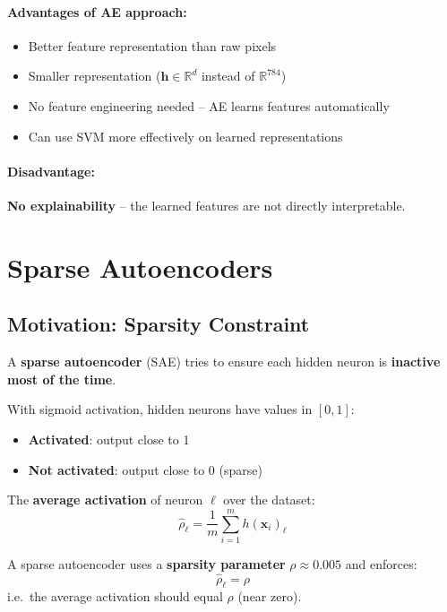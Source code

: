 \documentclass[12pt,a4paper]{article}
\newcommand{\R}{\mathbb{R}}
\newcommand{\vx}{\mathbf{x}}
\newcommand{\vh}{\mathbf{h}}
\begin{document}
\paragraph{Advantages of AE approach:}
\begin{itemize}
  \item Better feature representation than raw pixels
  \item Smaller representation ($\vh \in \R^d$ instead of $\R^{784}$)
  \item No feature engineering needed -- AE learns features automatically
  \item Can use SVM more effectively on learned representations
\end{itemize}

\paragraph{Disadvantage:} \textbf{No explainability} -- the learned features are not directly interpretable.

\section{Sparse Autoencoders}

\subsection{Motivation: Sparsity Constraint}

A \textbf{sparse autoencoder} (SAE) tries to ensure each hidden neuron is \textbf{inactive most of the time}.

\begin{definitionbox}
With sigmoid activation, hidden neurons have values in $[0,1]$:
\begin{itemize}
  \item \textbf{Activated}: output close to 1
  \item \textbf{Not activated}: output close to 0 (sparse)
\end{itemize}

The \textbf{average activation} of neuron $\ell$ over the dataset:
\[
  \hat{\rho}_\ell = \frac{1}{m}\sum_{i=1}^{m}h(\vx_i)_\ell
\]

A sparse autoencoder uses a \textbf{sparsity parameter} $\rho \approx 0.005$ and enforces:
\[
  \boxed{\hat{\rho}_\ell = \rho}
\]
i.e.\ the average activation should equal $\rho$ (near zero).
\end{definitionbox}
\end{document}
